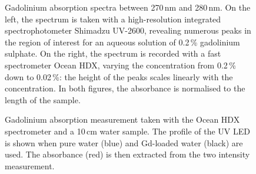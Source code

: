 \begin{figure}
	\centering
	\resizebox{0.49\linewidth}{!}{}
	\resizebox{0.49\linewidth}{!}{}
	\caption[Gadolinium absorption spectra]%
	{Gadolinium absorption spectra between 270\,nm and 280\,nm.
	On the left, the spectrum is taken with a high-resolution integrated spectrophotometer %
	Shimadzu UV-2600, revealing numerous peaks in the region of interest for an aqueous solution %
	of 0.2\,\% gadolinium sulphate.
	On the right, the spectrum is recorded with a fast spectrometer Ocean HDX, varying the concentration 
	from 0.2\,\% down to 0.02\,\%: the height of the peaks scales linearly with the concentration.
	In both figures, the absorbance is normalised to the length of the sample.}
	\label{fig:gad_lines}
\end{figure}


\begin{figure}
	\centering
	\resizebox{0.6\linewidth}{!}{}
	\caption[Ocean HDX spectra with a 10\,cm water sample]%
		{Gadolinium absorption measurement taken with the Ocean HDX spectrometer and a 10\,cm water sample.
		The profile of the UV LED is shown when pure water (blue) and Gd-loaded water (black) are used.
		The absorbance (red) is then extracted from the two intensity measurement.}
	\label{fig:uv_led}
\end{figure}


